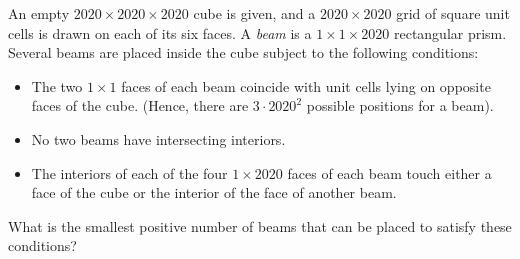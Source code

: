 An empty $2020\times2020\times2020$ cube is given, and a $2020\times2020$ grid of square unit cells is drawn on each of its six faces. A \emph{beam} is a $1\times1\times2020$ rectangular prism. Several beams are placed inside the cube subject to the following conditions:
\begin{itemize}
	\item The two $1\times1$ faces of each beam coincide with unit cells lying on opposite faces of the cube. (Hence, there are $3\cdot2020^2$ possible positions for a beam).
	\item No two beams have intersecting interiors.
	\item The interiors of each of the four $1\times2020$ faces of each beam touch either a face of the cube or the interior of the face of another beam.
\end{itemize}
What is the smallest positive number of beams that can be placed to satisfy these conditions?
